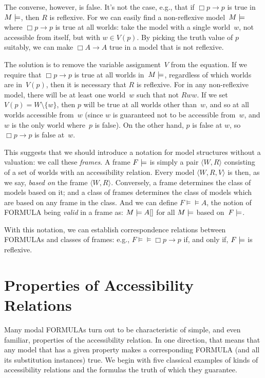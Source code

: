 \documentclass[10pt,a4paper]{article}
\newcommand*{\olup}[1]{\MakeUppercase{#1}}
\theoremstyle{plain}
\theoremstyle{definition}
\theoremstyle{remark}
\newcommand*{\olfileid}[3]{}
\newcommand*{\olsection}[1]{\section*{#1}}
\providecommand{\lif}{\mathbin{\rightarrow}}
\providecommand{\Entails}{\mathrel{\models}}
\providecommand{\mSat}[3]{\ensuremath{#1 \models #2[#3]}}
\providecommand{\mModel}[2]{\ensuremath{#1 \models #2}}
\providecommand{\tuple}[1]{\langle #1 \rangle}
\begin{document}
The converse, however, is false. It's not the case, e.g., that if
$\Box p \lif p$ is true in~$\mModel{M}$, then $R$ is reflexive. For we
can easily find a non-reflexive model~$\mModel{M}$ where $\Box p \lif
p$ is true at all worlds: take the model with a single world~$w$, not
accessible from itself, but with $w \in V(p)$. By picking the truth
value of $p$ suitably, we can make $\Box A \lif A$ true in a model
that is not reflexive.

The solution is to remove the variable assignment~$V$ from the
equation. If we require that $\Box p \lif p$ is true at all worlds
in~$\mModel{M}$, regardless of which worlds are in~$V(p)$, then it is
necessary that $R$ is reflexive. For in any non-reflexive model, there
will be at least one world~$w$ such that not $Rww$. If we set $V(p) =
W \setminus \{w\}$, then $p$ will be true at all worlds other
than~$w$, and so at all worlds accessible from~$w$ (since $w$ is
guaranteed not to be accessible from~$w$, and $w$ is the only world
where~$p$ is false). On the other hand, $p$ is false at $w$, so $\Box
p \lif p$ is false at~$w$.

This suggests that we should introduce a notation for model structures
without a valuation: we call these \emph{frames}. A frame $\mModel{F}$
is simply a pair $\tuple{W, R}$ consisting of a set of worlds with an
accessibility relation. Every model $\tuple{W, R, V}$ is then, as we
say, \emph{based on} the frame $\tuple{W, R}$. Conversely, a frame
determines the class of models based on it; and a class of frames
determines the class of models which are based on any frame in the
class. And we can define $\mModel{F} \Entails A$, the notion of \olup{formula}
being \emph{valid} in a frame as: $\mSat{M}{A}$ for all $\mModel{M}$
based on~$\mModel{F}$.

With this notation, we can establish correspondence relations between
\olup{formula}s and classes of frames: e.g., $\mModel{F} \Entails \Box p \lif p$
if, and only if, $\mModel{F}$ is reflexive.





\olfileid{nml}{frd}{acc}

\olsection{Properties of Accessibility Relations}

Many modal \olup{formula}s turn out to be characteristic of simple, and
even familiar, properties of the accessibility relation. In one
direction, that means that any model that has a given property makes a
corresponding \olup{formula} (and all its substitution instances)
true. We begin with five classical examples of kinds of accessibility
relations and the formulas the truth of which they guarantee.
\end{document}
